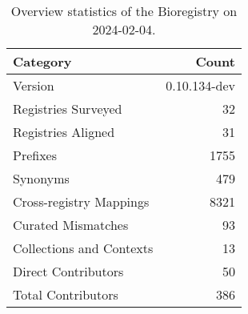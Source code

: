 \begin{table}
\caption{Overview statistics of the Bioregistry on 2024-02-04.}
\label{tab:bioregistry-summary}
\begin{tabular}{lr}
\toprule
Category & Count \\
\midrule
Version & 0.10.134-dev \\
Registries Surveyed & 32 \\
Registries Aligned & 31 \\
Prefixes & 1755 \\
Synonyms & 479 \\
Cross-registry Mappings & 8321 \\
Curated Mismatches & 93 \\
Collections and Contexts & 13 \\
Direct Contributors & 50 \\
Total Contributors & 386 \\
\bottomrule
\end{tabular}
\end{table}
